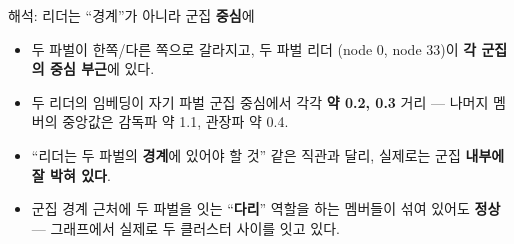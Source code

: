 \begin{frame}{해석: 리더는 ``경계''가 아니라 군집 \textbf{중심}에}
  \begin{itemize}
    \item 두 파벌이 한쪽/다른 쪽으로 갈라지고, 두 파벌 리더
      (node 0, node 33)이 \textbf{각 군집의 중심 부근}에 있다.
    \item 두 리더의 임베딩이 자기 파벌 군집 중심에서 각각
      \textbf{약 0.2, 0.3} 거리 --- 나머지 멤버의 중앙값은
      감독파 약 1.1, 관장파 약 0.4.
    \item ``리더는 두 파벌의 \textbf{경계}에 있어야 할 것'' 같은
      직관과 달리, 실제로는 군집 \textbf{내부에 잘 박혀 있다}.
    \item 군집 경계 근처에 두 파벌을 잇는 ``\textbf{다리}'' 역할을
      하는 멤버들이 섞여 있어도 \textbf{정상} --- 그래프에서
      실제로 두 클러스터 사이를 잇고 있다.
  \end{itemize}
\end{frame}
